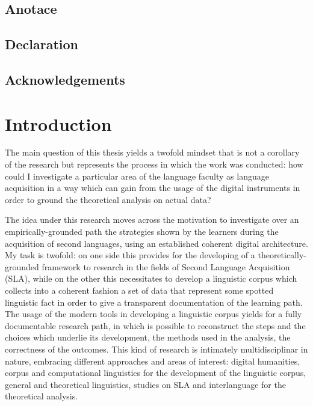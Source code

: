 \documentclass[
  a4paper,
  twoside,
  12pt,
  chapterprefix=false,
  bibliography=totocnumbered,
  listof=flat]{scrbook}
\begin{document}
\hypertarget{anotace}{%
\section*{Anotace}\label{anotace}}

\hypertarget{declaration}{%
\section*{Declaration}\label{declaration}}

\hypertarget{acknowledgements}{%
\section*{Acknowledgements}\label{acknowledgements}}

\mainmatter

\hypertarget{introduction}{%
\chapter{Introduction}\label{introduction}}

The main question of this thesis yields a twofold mindset that is not a corollary of the research but represents the process in which the work was conducted: how could I investigate a particular area of the language faculty as language acquisition in a way which can gain from the usage of the digital instruments in order to ground the theoretical analysis on actual data?

The idea under this research moves across the motivation to investigate over an empirically-grounded path the strategies shown by the learners during the acquisition of second languages, using an established coherent digital architecture.
My task is twofold: on one side this provides for the developing of a theoretically-grounded framework to research in the fields of Second Language Acquisition (SLA), while on the other this necessitates to develop a linguistic corpus which collects into a coherent fashion a set of data that represent some spotted linguistic fact in order to give a transparent documentation of the learning path.
The usage of the modern tools in developing a linguistic corpus yields for a fully documentable research path, in which is possible to reconstruct the steps and the choices which underlie its development, the methods used in the analysis, the correctness of the outcomes.
This kind of research is intimately multidisciplinar in nature, embracing different approaches and areas of interest: digital humanities, corpus and computational linguistics for the development of the linguistic corpus, general and theoretical linguistics, studies on SLA and interlanguage for the theoretical analysis.
\end{document}
